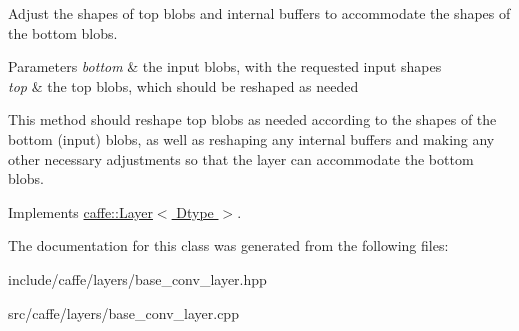Adjust the shapes of top blobs and internal buffers to accommodate the shapes of the bottom blobs. 


\begin{DoxyParams}{Parameters}
{\em bottom} & the input blobs, with the requested input shapes \\
\hline
{\em top} & the top blobs, which should be reshaped as needed\\
\hline
\end{DoxyParams}
This method should reshape top blobs as needed according to the shapes of the bottom (input) blobs, as well as reshaping any internal buffers and making any other necessary adjustments so that the layer can accommodate the bottom blobs. 

Implements \hyperlink{classcaffe_1_1Layer_ad9d391b972c769c0ebee34ca6d1c973e}{caffe\+::\+Layer$<$ Dtype $>$}.



The documentation for this class was generated from the following files\+:\begin{DoxyCompactItemize}
\item 
include/caffe/layers/base\+\_\+conv\+\_\+layer.\+hpp\item 
src/caffe/layers/base\+\_\+conv\+\_\+layer.\+cpp\end{DoxyCompactItemize}
